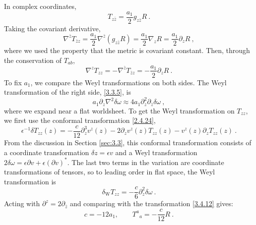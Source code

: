 In complex coordinates,    
\begin{equation}
	T_{z \bar{z}}=\frac{a_{1}}{2} g_{z \bar{z}} R \:. \label{3.4.9}
\end{equation}
Taking the covariant derivative,    
\begin{equation}
	\nabla^{\bar{z}} T_{\bar{z} z}=\frac{a_{1}}{2} \nabla^{\bar{z}}(g_{z \bar{z}} R)=\frac{a_{1}}{2} \nabla_{z} R=\frac{a_{1}}{2} \partial_{z} R \:, \label{3.4.10}
 \end{equation}
where we used the property that the metric is covariant constant. Then, through the conservation of $T_{ab}$,    
\begin{equation}\label{3.4.11}
	\nabla^{z} T_{z z}=-\nabla^{\bar{z}} T_{\bar{z} z}=-\frac{a_{1}}{2} \partial_{z} R \:.
\end{equation}
To fix $a_1$, we compare the Weyl transformations on both sides.    
The Weyl transformation of the right side, \eqref{3.3.5}, is    
\begin{equation}\label{3.4.12}
	a_{1} \partial_{z} \nabla^{2} \delta \omega \approx 4 a_{1} \partial_{z}^{2} \partial_{\bar{z}} \delta \omega \:,
\end{equation}
where we expand near a flat worldsheet. To get the Weyl transformation on $T_{zz}$, we first use the conformal transformation \eqref{2.4.24},    
\begin{equation}
	\epsilon^{-1} \delta T_{z z}(z)=-\frac{c}{12} \partial_{z}^{3} v^{z}(z)-2 \partial_{z} v^{z}(z) T_{z z}(z)-v^{z}(z) \partial_{z} T_{z z}(z) \:. \label{3.4.13}
\end{equation}
From the discussion in Section \ref{sec:3.3}, this conformal transformation consists of a coordinate transformation $\delta z=\epsilon v$ and a Weyl transformation $2 \delta \omega=\epsilon \partial v+\epsilon(\partial v)^{*}$.    
The last two terms in the variation are coordinate transformations of tensors, so to leading order in flat space, the Weyl transformation is    
\begin{equation}
	\delta_{\mathrm{W}} T_{z z}=-\frac{c}{6} \partial_{z}^{2} \delta \omega \:. \label{3.4.14}
\end{equation}
Acting with $\partial^{z}=2 \partial_{\bar{z}}$ and comparing with the transformation \eqref{3.4.12} gives:    
\begin{equation}
	c=-12 a_{1}, \qquad {T^a}_{a}=-\frac{c}{12} R \:. \label{3.4.15}
\end{equation}
